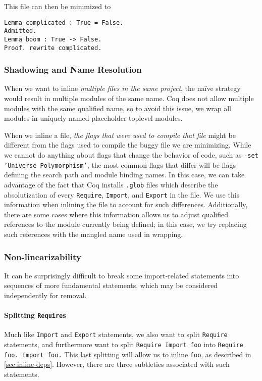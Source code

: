 \documentclass[a4paper,USenglish,cleveref,autoref,thm-restate]{lipics-v2021}
\begin{document}
This file can then be minimized to
\begin{verbatim}
Lemma complicated : True = False.
Admitted.
Lemma boom : True -> False.
Proof. rewrite complicated.
\end{verbatim}

\subsubsection{Shadowing and Name Resolution}

When we want to inline \emph{multiple files in the same project}, the na\"ive strategy would result in multiple modules of the same name.
Coq does not allow multiple modules with the same qualified name, so to avoid this issue, we wrap all modules in uniquely named placeholder toplevel modules.

When we inline a file, \emph{the flags that were used to compile that file} might be different from the flags used to compile the buggy file we are minimizing.
While we cannot do anything about flags that change the behavior of code, such as \texttt{-set 'Universe Polymorphism'}, the most common flags that differ will be flags defining the search path and module binding names.
In this case, we can take advantage of the fact that Coq installs \texttt{.glob} files which describe the absolutization of every \texttt{Require}, \texttt{Import}, and \texttt{Export} in the file.
We use this information when inlining the file to account for such differences.
Additionally, there are some cases where this information allows us to adjust qualified references to the module currently being defined; in this case, we try replacing such references with the mangled name used in wrapping.

\subsubsection{Non-linearizability}

It can be surprisingly difficult to break some import-related statements into sequences of more fundamental statements, which may be considered independently for removal.

\paragraph{Splitting \texttt{Require}s}
Much like \verb|Import| and \verb|Export| statements, we also want to split \verb|Require| statements, and furthermore want to split \verb|Require Import foo| into \texttt{Require foo. Import foo.}
This last splitting will allow us to inline \verb|foo|, as described in \autoref{sec:inline-deps}.
However, there are three subtleties associated with such statements.
\end{document}

